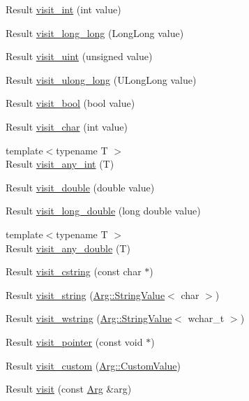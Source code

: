 \begin{DoxyCompactItemize}
\item 
Result \hyperlink{classfmt_1_1ArgVisitor_ac6d79e3d931a9f56f40bca08f8651cdf}{visit\+\_\+int} (int value)
\item 
Result \hyperlink{classfmt_1_1ArgVisitor_ab5687cccaae516d3e6e94775737ff798}{visit\+\_\+long\+\_\+long} (Long\+Long value)
\item 
Result \hyperlink{classfmt_1_1ArgVisitor_a51494a02bd4573280fc1cc6fc921f871}{visit\+\_\+uint} (unsigned value)
\item 
Result \hyperlink{classfmt_1_1ArgVisitor_ac4424926e9c138b3503039d91c18c087}{visit\+\_\+ulong\+\_\+long} (U\+Long\+Long value)
\item 
Result \hyperlink{classfmt_1_1ArgVisitor_ad3013b580959ecbfaae97f29a35964ae}{visit\+\_\+bool} (bool value)
\item 
Result \hyperlink{classfmt_1_1ArgVisitor_ad635596afa3cd1e4983db071f045dabd}{visit\+\_\+char} (int value)
\item 
{\footnotesize template$<$typename T $>$ }\\Result \hyperlink{classfmt_1_1ArgVisitor_a5e33c073c34ca49a6f1dd82181e2d98f}{visit\+\_\+any\+\_\+int} (T)
\item 
Result \hyperlink{classfmt_1_1ArgVisitor_a2a7a4cbb1df7a8b3c310a607600773ae}{visit\+\_\+double} (double value)
\item 
Result \hyperlink{classfmt_1_1ArgVisitor_aa0b2e1792ff7e62d1a49a3118d3c10db}{visit\+\_\+long\+\_\+double} (long double value)
\item 
{\footnotesize template$<$typename T $>$ }\\Result \hyperlink{classfmt_1_1ArgVisitor_a9a2cdc09adb9783cddb2548691e6720c}{visit\+\_\+any\+\_\+double} (T)
\item 
Result \hyperlink{classfmt_1_1ArgVisitor_a6a91a7125820563502f1f5bb7a8c85be}{visit\+\_\+cstring} (const char $\ast$)
\item 
Result \hyperlink{classfmt_1_1ArgVisitor_ac39e46583b36900aa8df8e533648cf99}{visit\+\_\+string} (\hyperlink{structfmt_1_1internal_1_1Value_1_1StringValue}{Arg\+::\+String\+Value}$<$ char $>$)
\item 
Result \hyperlink{classfmt_1_1ArgVisitor_abd76337375076717e6089763dcfb1ad0}{visit\+\_\+wstring} (\hyperlink{structfmt_1_1internal_1_1Value_1_1StringValue}{Arg\+::\+String\+Value}$<$ wchar\+\_\+t $>$)
\item 
Result \hyperlink{classfmt_1_1ArgVisitor_a80e62b2dcd7e7e38208a4863826ec731}{visit\+\_\+pointer} (const void $\ast$)
\item 
Result \hyperlink{classfmt_1_1ArgVisitor_a19a38c25e9c45f9c6a6674f7dfaf3759}{visit\+\_\+custom} (\hyperlink{structfmt_1_1internal_1_1Value_1_1CustomValue}{Arg\+::\+Custom\+Value})
\item 
Result \hyperlink{classfmt_1_1ArgVisitor_a19a979776fc789baaf038ab216e245bb}{visit} (const \hyperlink{structfmt_1_1internal_1_1Arg}{Arg} \&arg)
\end{DoxyCompactItemize}


